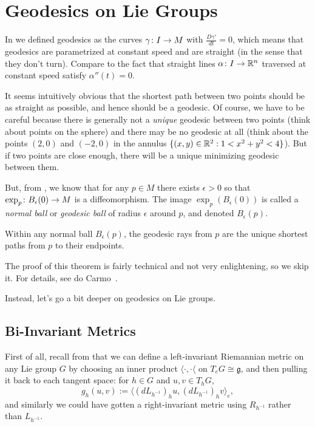 
\section{Geodesics on Lie Groups}
\label{sec:geodesics on lie groups}

In  we defined geodesics as the curves $\gamma \colon\thinspace\! I \to M$ with $\frac{D\gamma'}{dt} = 0$, which means that geodesics are parametrized at constant speed and are straight (in the sense that they don't turn). Compare to the fact that straight lines $\alpha \colon\thinspace\! I \to \mathbb{R}^n$ traversed at constant speed satisfy $\alpha''(t)= 0$.

It seems intuitively obvious that the shortest path between two points should be as straight as possible, and hence should be a geodesic. Of course, we have to be careful because there is generally not a \emph{unique} geodesic between two points (think about points on the sphere) and there may be no geodesic at all (think about the points $(2,0)$ and $(-2,0)$ in the annulus $\{(x,y) \in \mathbb{R}^2 : 1 < x^2 + y^2 < 4\}$). But if two points are close enough, there will be a unique minimizing geodesic between them.

But, from , we know that for any $p \in M$ there exists $\epsilon > 0$ so that $\exp_p \colon\thinspace\! B_\epsilon(0) \to M$ is a diffeomorphism. The image $\exp_p(B_\epsilon(0))$ is called a \emph{normal ball} or \emph{geodesic ball} of radius $\epsilon$ around $p$, and denoted $B_\epsilon(p)$.

\begin{theorem}\label{thm:locally minimality of geodesics}
	Within any normal ball $B_\epsilon(p)$, the geodesic rays from $p$ are the unique shortest paths from $p$ to their endpoints.
\end{theorem}

The proof of this theorem is fairly technical and not very enlightening, so we skip it. For details, see do Carmo~\cite[\S 3.3]{docarmoRiemannianGeometry1992}.

Instead, let's go a bit deeper on geodesics on Lie groups.

\subsection{Bi-Invariant Metrics}

First of all, recall from  that we can define a left-invariant Riemannian metric on any Lie group $G$ by choosing an inner product $\langle \cdot , \cdot \langle$ on $T_eG \cong \mathfrak{g}$, and then pulling it back to each tangent space: for $h \in G$ and $u,v \in T_hG$,
\begin{equation}\label{eq:left-invariant metric def}
	g_h(u,v) := \langle (dL_{h^{-1}})_h u, (dL_{h^{-1}})_hv \rangle_e,
\end{equation}
and similarly we could have gotten a right-invariant metric using $R_{h^{-1}}$ rather than $L_{h^{-1}}$.

